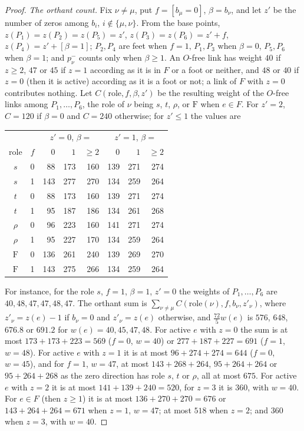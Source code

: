 \begin{proof}
\emph{The orthant count.} Fix $\nu\ne\mu$, put $f=[b_\mu=0]$, $\beta=b_\nu$,
and let $z'$ be the number of zeros among $b_i$, $i\notin\{\mu,\nu\}$. From
the base points, $z(P_1)=z(P_2)=z(P_5)=z'$, $z(P_3)=z(P_6)=z'+f$,
$z(P_4)=z'+[\beta=1]$; $P_2,P_4$ are feet when $f=1$, $P_1,P_3$ when
$\beta=0$, $P_5,P_6$ when $\beta=1$; and $p^-_\nu$ counts only when
$\beta\ge1$. An $O$-free link has weight $40$ if $z\ge2$, $47$ or $45$ if
$z=1$ according as it is in $F$ or a foot or neither, and $48$ or $40$ if
$z=0$ (then it is active) according as it is a foot or not; a link of $F$ with
$z=0$ contributes nothing. Let $C(\text{role},f,\beta,z')$ be the resulting
weight of the $O$-free links among $P_1,\dots,P_6$, the role of $\nu$ being
$s$, $t$, $\rho$, or $\mathrm F$ when $e\in F$. For $z'=2$, $C=120$ if
$\beta=0$ and $C=240$ otherwise; for $z'\le1$ the values are
\begin{center}
\small
\begin{tabular}{cc|rrr|rrr}
\toprule
&&\multicolumn{3}{c|}{$z'=0$, $\beta=$}&\multicolumn{3}{c}{$z'=1$, $\beta=$}\\
role&$f$&$0$&$1$&${\ge}2$&$0$&$1$&${\ge}2$\\
\midrule
$s$&0&88&173&160&139&271&274\\
$s$&1&143&277&270&134&259&264\\
$t$&0&88&173&160&139&271&274\\
$t$&1&95&187&186&134&261&268\\
$\rho$&0&96&223&160&141&271&274\\
$\rho$&1&95&227&170&134&259&264\\
$\mathrm F$&0&136&261&240&139&269&270\\
$\mathrm F$&1&143&275&266&134&259&264\\
\bottomrule
\end{tabular}
\end{center}
For instance, for the role $s$, $f=1$, $\beta=1$, $z'=0$ the weights of
$P_1,\dots,P_6$ are $40,48,47,47,48,47$. The orthant sum is
$\sum_{\nu\ne\mu}C(\text{role}(\nu),f,b_\nu,z'_\nu)$, where $z'_\nu=z(e)-1$ if
$b_\nu=0$ and $z'_\nu=z(e)$ otherwise, and $\frac{72}5w(e)$ is $576$, $648$,
$676.8$ or $691.2$ for $w(e)=40,45,47,48$. For active $e$ with $z=0$ the sum
is at most $173+173+223=569$ ($f=0$, $w=40$) or $277+187+227=691$ ($f=1$,
$w=48$). For active $e$ with $z=1$ it is at most $96+274+274=644$ ($f=0$,
$w=45$), and for $f=1$, $w=47$, at most $143+268+264$, $95+264+264$ or
$95+264+268$ as the zero direction has role $s$, $t$ or $\rho$, all at most
$675$. For active $e$ with $z=2$ it is at most $141+139+240=520$, for $z=3$
it is $360$, with $w=40$. For $e\in F$ (then $z\ge1$) it is at most
$136+270+270=676$ or $143+264+264=671$ when $z=1$, $w=47$; at most $518$ when
$z=2$; and $360$ when $z=3$, with $w=40$.
\end{proof}

